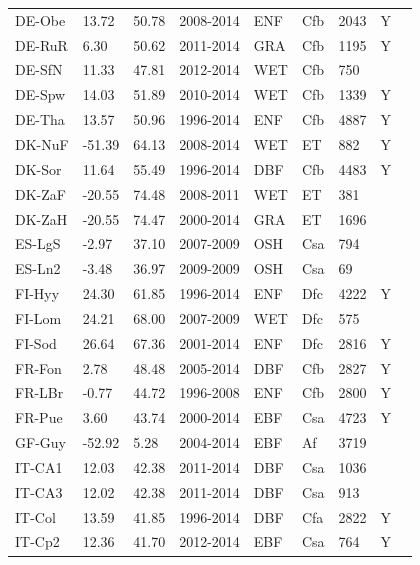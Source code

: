 \documentclass{myreport}
\begin{document}
\begin{longtable}{lllllllll}
  DE-Obe & 13.72 & 50.78 & 2008-2014 & ENF & Cfb & 2043 & Y & \citet{DE-Obe} \\ 
  DE-RuR & 6.30 & 50.62 & 2011-2014 & GRA & Cfb & 1195 & Y & \citet{DE-RuR} \\ 
  DE-SfN & 11.33 & 47.81 & 2012-2014 & WET & Cfb & 750 &  & \citet{DE-SfN} \\ 
  DE-Spw & 14.03 & 51.89 & 2010-2014 & WET & Cfb & 1339 & Y & \citet{DE-Spw} \\ 
  DE-Tha & 13.57 & 50.96 & 1996-2014 & ENF & Cfb & 4887 & Y & \citet{DE-Tha} \\ 
  DK-NuF & -51.39 & 64.13 & 2008-2014 & WET & ET & 882 & Y & \citet{DK-NuF} \\ 
  DK-Sor & 11.64 & 55.49 & 1996-2014 & DBF & Cfb & 4483 & Y & \citet{DK-Sor} \\ 
  DK-ZaF & -20.55 & 74.48 & 2008-2011 & WET & ET & 381 &  & \citet{DK-ZaF} \\ 
  DK-ZaH & -20.55 & 74.47 & 2000-2014 & GRA & ET & 1696 &  & \citet{DK-ZaH} \\ 
  ES-LgS & -2.97 & 37.10 & 2007-2009 & OSH & Csa & 794 &  & \citet{ES-LgS} \\ 
  ES-Ln2 & -3.48 & 36.97 & 2009-2009 & OSH & Csa &  69 &  & \citet{ES-Ln2} \\ 
  FI-Hyy & 24.30 & 61.85 & 1996-2014 & ENF & Dfc & 4222 & Y & \citet{FI-Hyy} \\ 
  FI-Lom & 24.21 & 68.00 & 2007-2009 & WET & Dfc & 575 &  & \citet{FI-Lom} \\ 
  FI-Sod & 26.64 & 67.36 & 2001-2014 & ENF & Dfc & 2816 & Y & \citet{FI-Sod} \\ 
  FR-Fon & 2.78 & 48.48 & 2005-2014 & DBF & Cfb & 2827 & Y & \citet{FR-Fon} \\ 
  FR-LBr & -0.77 & 44.72 & 1996-2008 & ENF & Cfb & 2800 & Y & \citet{FR-LBr} \\ 
  FR-Pue & 3.60 & 43.74 & 2000-2014 & EBF & Csa & 4723 & Y & \citet{FR-Pue} \\ 
  GF-Guy & -52.92 & 5.28 & 2004-2014 & EBF & Af & 3719 &  & \citet{GF-Guy} \\ 
  IT-CA1 & 12.03 & 42.38 & 2011-2014 & DBF & Csa & 1036 &  & \citet{IT-CA1} \\ 
  IT-CA3 & 12.02 & 42.38 & 2011-2014 & DBF & Csa & 913 &  & \citet{IT-CA3} \\ 
  IT-Col & 13.59 & 41.85 & 1996-2014 & DBF & Cfa & 2822 & Y & \citet{IT-Col} \\ 
  IT-Cp2 & 12.36 & 41.70 & 2012-2014 & EBF & Csa & 764 & Y & \citet{IT-Cp2} \\ 

\end{longtable}
\end{document}
